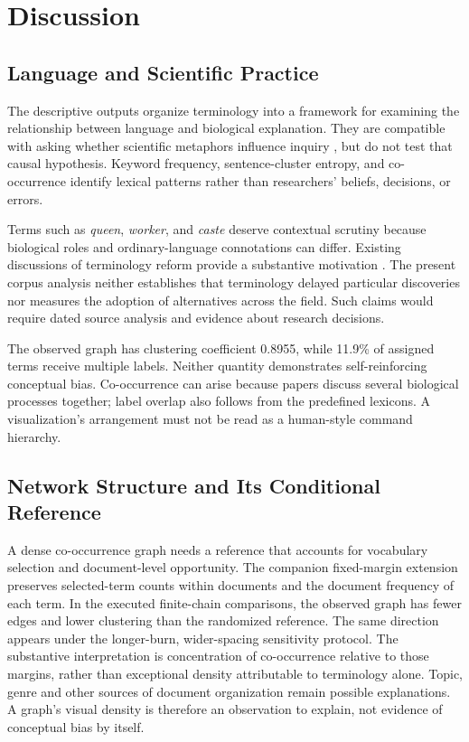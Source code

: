 \documentclass[
]{article}
\numberwithin{equation}{section}
\begin{document}
\clearpage

\section{Discussion}\label{sec:discussion}

\subsection{Language and Scientific
Practice}\label{language-and-scientific-practice}

The descriptive outputs organize terminology into a framework for
examining the relationship between language and biological explanation.
They are compatible with asking whether scientific metaphors influence
inquiry \citep{latour1987, longino1990, lakoff1980metaphors}, but do not
test that causal hypothesis. Keyword frequency, sentence-cluster
entropy, and co-occurrence identify lexical patterns rather than
researchers' beliefs, decisions, or errors.

Terms such as \emph{queen}, \emph{worker}, and \emph{caste} deserve
contextual scrutiny because biological roles and ordinary-language
connotations can differ. Existing discussions of terminology reform
provide a substantive motivation \citep{herbers2006, herbers2007}. The
present corpus analysis neither establishes that terminology delayed
particular discoveries nor measures the adoption of alternatives across
the field. Such claims would require dated source analysis and evidence
about research decisions.

The observed graph has clustering coefficient 0.8955, while 11.9\% of
assigned terms receive multiple labels. Neither quantity demonstrates
self-reinforcing conceptual bias. Co-occurrence can arise because papers
discuss several biological processes together; label overlap also
follows from the predefined lexicons. A visualization's arrangement must
not be read as a human-style command hierarchy.

\subsection{Network Structure and Its Conditional
Reference}\label{network-structure-and-its-conditional-reference}

A dense co-occurrence graph needs a reference that accounts for
vocabulary selection and document-level opportunity. The companion
fixed-margin extension preserves selected-term counts within documents
and the document frequency of each term. In the executed finite-chain
comparisons, the observed graph has fewer edges and lower clustering
than the randomized reference. The same direction appears under the
longer-burn, wider-spacing sensitivity protocol. The substantive
interpretation is concentration of co-occurrence relative to those
margins, rather than exceptional density attributable to terminology
alone. Topic, genre and other sources of document organization remain
possible explanations. A graph's visual density is therefore an
observation to explain, not evidence of conceptual bias by itself.
\end{document}
